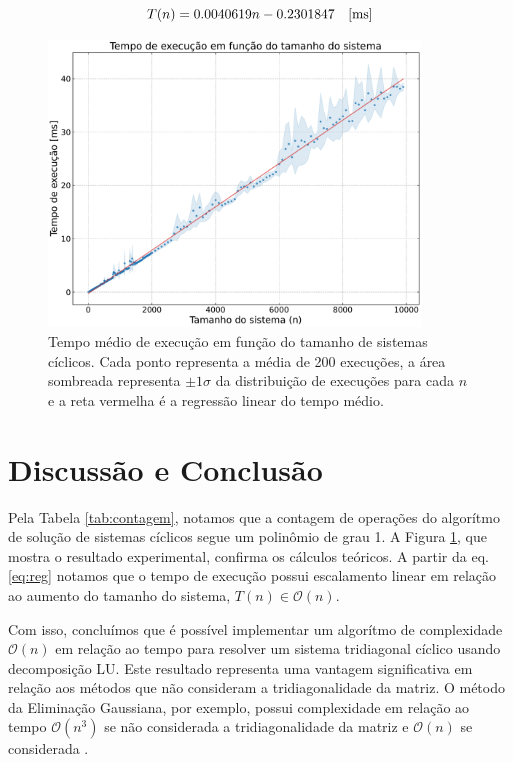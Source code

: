 \documentclass[a4,12pt]{horizon-theme}
\begin{document}
\begin{equation}\label{eq:reg}
  T(n) = 0.0040619n -0.2301847 \quad \rm{[ms]}
\end{equation}

\begin{figure}[!ht]
  \centering
  \includegraphics[width=0.88\textwidth]{../tempo.pdf}
  \caption{Tempo médio de execução em função do tamanho de sistemas cíclicos. Cada ponto representa a média de 200 execuções, a área sombreada representa $\pm 1\sigma$ da distribuição de execuções para cada $n$ e a reta vermelha é a regressão linear do tempo médio.}
  \label{fig:tempos}
\end{figure}


\section{Discussão e Conclusão}
\label{sec:conclusao}
Pela Tabela \ref{tab:contagem}, notamos que a contagem de operações do algorítmo de solução de sistemas cíclicos segue um polinômio de grau 1. A Figura \ref{fig:tempos}, que mostra o resultado experimental, confirma os cálculos teóricos. A partir da eq. \eqref{eq:reg} notamos que o tempo de execução possui escalamento linear em relação ao aumento do tamanho do sistema, $T(n) \in \mathcal{O}(n)$.

Com isso, concluímos que é possível implementar um algorítmo de complexidade $\mathcal{O}(n)$ em relação ao tempo para resolver um sistema tridiagonal cíclico usando decomposição LU. Este resultado representa uma vantagem significativa em relação aos métodos que não consideram a tridiagonalidade da matriz. O método da Eliminação Gaussiana, por exemplo, possui complexidade em relação ao tempo $\mathcal{O}(n^3)$ se não considerada a tridiagonalidade da matriz e $\mathcal{O}(n)$ se considerada \citep{ryaben}.
\end{document}
